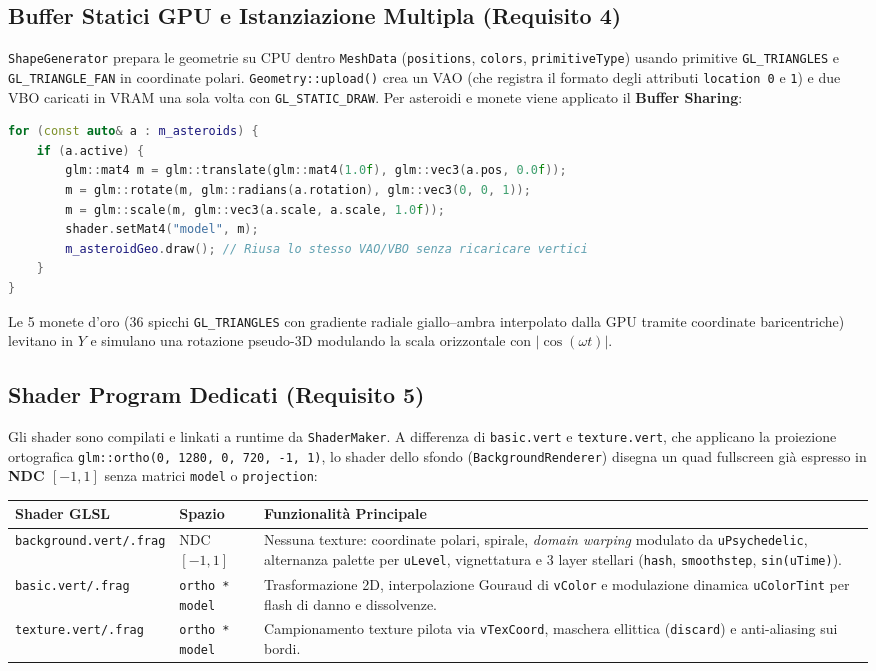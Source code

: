 \documentclass[11pt,a4paper]{article}
\begin{document}
\subsection{Buffer Statici GPU e Istanziazione Multipla (Requisito 4)}
\texttt{ShapeGenerator} prepara le geometrie su CPU dentro \texttt{MeshData} (\texttt{positions}, \texttt{colors}, \texttt{primitiveType}) usando primitive \texttt{GL\_TRIANGLES} e \texttt{GL\_TRIANGLE\_FAN} in coordinate polari. \texttt{Geometry::upload()} crea un VAO (che registra il formato degli attributi \texttt{location 0} e \texttt{1}) e due VBO caricati in VRAM una sola volta con \texttt{GL\_STATIC\_DRAW}. Per asteroidi e monete viene applicato il \textbf{Buffer Sharing}:
\begin{lstlisting}[language=C++]
for (const auto& a : m_asteroids) {
    if (a.active) {
        glm::mat4 m = glm::translate(glm::mat4(1.0f), glm::vec3(a.pos, 0.0f));
        m = glm::rotate(m, glm::radians(a.rotation), glm::vec3(0, 0, 1));
        m = glm::scale(m, glm::vec3(a.scale, a.scale, 1.0f));
        shader.setMat4("model", m);
        m_asteroidGeo.draw(); // Riusa lo stesso VAO/VBO senza ricaricare vertici
    }
}
\end{lstlisting}
Le 5 monete d'oro (36 spicchi \texttt{GL\_TRIANGLES} con gradiente radiale giallo--ambra interpolato dalla GPU tramite coordinate baricentriche) levitano in $Y$ e simulano una rotazione pseudo-3D modulando la scala orizzontale con $|\cos(\omega t)|$.

\subsection{Shader Program Dedicati (Requisito 5)}
Gli shader sono compilati e linkati a runtime da \texttt{ShaderMaker}. A differenza di \texttt{basic.vert} e \texttt{texture.vert}, che applicano la proiezione ortografica \texttt{glm::ortho(0, 1280, 0, 720, -1, 1)}, lo shader dello sfondo (\texttt{BackgroundRenderer}) disegna un quad fullscreen già espresso in \textbf{NDC $[-1, 1]$} senza matrici \texttt{model} o \texttt{projection}:

\begin{center}
\small
\begin{tabularx}{\linewidth}{@{}l l X@{}}
\toprule
\textbf{Shader GLSL} & \textbf{Spazio} & \textbf{Funzionalità Principale} \\
\midrule
\texttt{background.vert/.frag} & NDC $[-1,1]$ & Nessuna texture: coordinate polari, spirale, \textit{domain warping} modulato da \texttt{uPsychedelic}, alternanza palette per \texttt{uLevel}, vignettatura e 3 layer stellari (\texttt{hash}, \texttt{smoothstep}, \texttt{sin(uTime)}). \\
\texttt{basic.vert/.frag} & \texttt{ortho * model} & Trasformazione 2D, interpolazione Gouraud di \texttt{vColor} e modulazione dinamica \texttt{uColorTint} per flash di danno e dissolvenze. \\
\texttt{texture.vert/.frag} & \texttt{ortho * model} & Campionamento texture pilota via \texttt{vTexCoord}, maschera ellittica (\texttt{discard}) e anti-aliasing sui bordi. \\
\bottomrule
\end{tabularx}
\end{center}
\end{document}
